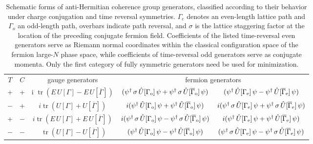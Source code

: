 \documentclass [12pt]{article}
\newcommand{\tr}{\mathop{\mathrm{tr}}}
\begin{document}
\begin{table}
\begin{center}
\setlength{\tabcolsep}{4pt}
\hspace*{-10pt}%
\begin{tabular}{ccccc}
$T$ & $C$ & gauge generators & \multicolumn{2}{c}{fermion generators}
\\[3pt]
+ & + & \phantom i $\tr (E \, U[\Gamma] - E \, U[\overline\Gamma])$
	& $ (\psi^\dagger \, \sigma\, \hat U[\Gamma_{\rm o}]\, \psi +
	      \psi^\dagger \, \sigma\, \hat U[\overline\Gamma_{\rm o}]\, \psi) $
	& $ (\psi^\dagger \, \hat U[\Gamma_{\rm e}]\, \psi -
	      \psi^\dagger \, \hat U[\overline\Gamma_{\rm e}]\, \psi) $

\\[3pt]
$-$ & + & $i \tr ( U[\Gamma] + U[\overline\Gamma])$
	& $ i(\psi^\dagger \, \hat U[\Gamma_{\rm o}]\, \psi +
	      \psi^\dagger \, \hat U[\overline\Gamma_{\rm o}]\, \psi) $
	& $ i(\psi^\dagger \, \sigma\, \hat U[\Gamma_{\rm e}]\, \psi +
	      \psi^\dagger \, \sigma\, \hat U[\overline\Gamma_{\rm e}]\, \psi )$

\\[3pt]
+ & $-$ & $i \tr (E \, U[\Gamma] + E \, U[\overline\Gamma])$
	& $ i(\psi^\dagger \, \sigma\, \hat U[\Gamma_{\rm o}]\, \psi -
	      \psi^\dagger \, \sigma\, \hat U[\overline\Gamma_{\rm o}]\, \psi )$
	& $ i(\psi^\dagger \, \hat U[\Gamma_{\rm e}]\, \psi +
	      \psi^\dagger \, \hat U[\overline\Gamma_{\rm e}]\, \psi )$

\\[3pt]
$-$ & $-$ & $ \phantom i \tr (U[\Gamma] - U[\overline\Gamma])$
	& $ (\psi^\dagger \, \hat U[\Gamma_{\rm o}]\, \psi -
	      \psi^\dagger \, \hat U[\overline\Gamma_{\rm o}]\, \psi )$
	& $ (\psi^\dagger \, \sigma\, \hat U[\Gamma_{\rm e}]\, \psi -
	      \psi^\dagger \, \sigma\, \hat U[\overline\Gamma_{\rm e}]\, \psi )$
\end{tabular}%
\hspace*{-10pt}
\end{center}
\caption
    {%
    Schematic forms of anti-Hermitian coherence group generators,
    classified according to their behavior under charge conjugation and
    time reversal symmetries.
    $\Gamma_e$ denotes an even-length lattice path and
    $\Gamma_o$ an odd-length path,
    overbars indicate path reversal,
    and $\sigma$ is the lattice staggering factor at the location of the preceding
    conjugate fermion field.
    Coefficients of the listed time-reversal even generators serve as Riemann normal
    coordinates within the classical configuration space of the fermion large-$N$ phase
    space, while coefficients of time-reversal odd generators serve as conjugate momenta.
    Only the first category of fully symmetric generators need be used for minimization.
    \label{tab:gens}
    }
\end{table}
\end{document}
